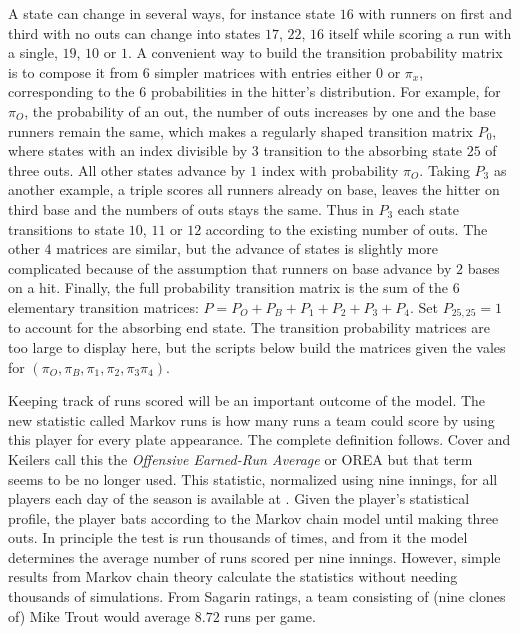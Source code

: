 \documentclass[12pt]{article}
\begin{document}
A state can change in several ways, for instance state \( 16 \) with
runners on first and third with no outs can change into states \( 17 \),
\( 22 \), \( 16 \) itself while scoring a run with a single, \( 19 \), \(
10 \) or \( 1 \).  A convenient way to build the transition probability
matrix is to compose it from \( 6 \) simpler matrices with entries
either \( 0 \) or \( \pi_x \), corresponding to the \( 6 \)
probabilities in the hitter's distribution.  For example, for \( \pi_O \),
the probability of an out, the number of outs increases by one and the
base runners remain the same, which makes a regularly shaped transition
matrix \( P_0 \), where states with an index divisible by \( 3 \)
transition to the absorbing state \( 25 \) of three outs.  All other
states advance by \( 1 \) index with probability \( \pi_O \).  Taking \(
P_3 \) as another example, a triple scores all runners already on base,
leaves the hitter on third base and the numbers of outs stays the same.
Thus in \( P_3 \) each state transitions to state \( 10 \), \( 11 \) or \(
12 \) according to the existing number of outs.  The other \( 4 \)
matrices are similar, but the advance of states is slightly more
complicated because of the assumption that runners on base advance by \(
2 \) bases on a hit.  Finally, the full probability transition matrix is
the sum of the \( 6 \) elementary transition matrices:  \( P = P_O + P_B
+ P_1 + P_2 + P_3 + P_4 \).  Set \( P_{25, 25} = 1 \) to account for the
absorbing end state.  The transition probability matrices are too large
to display here, but the scripts below build the matrices given the
vales for \( (\pi_O, \pi_B, \pi_1, \pi_2, \pi_3 \pi_4) \).

Keeping track of runs scored will be an important outcome of the model.
The new statistic called Markov runs
%
is how many runs a team could score by using this
player for every plate appearance.  The complete definition follows.
Cover and Keilers
\cite{cover77} call this the \emph{Offensive Earned-Run Average} or OREA
but that term seems to be no longer used.  This statistic, normalized
using nine innings, for all players each day of the season is available
at .  Given the player's statistical profile, the player
bats according to the Markov chain model until making three outs.  In
principle the test is run thousands of times, and from it the model
determines the average number of runs scored per nine innings. However,
simple results from Markov chain theory calculate the statistics without
needing thousands of simulations.  From Sagarin ratings, a team
consisting of (nine clones of) Mike Trout would average \( 8.72 \) runs
per game.
\end{document}
